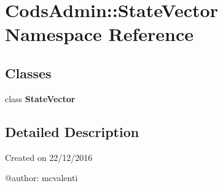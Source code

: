 \section{\-Cods\-Admin\-:\-:\-State\-Vector \-Namespace \-Reference}
\label{namespace_cods_admin_1_1_state_vector}
\subsection*{\-Classes}
\begin{DoxyCompactItemize}
\item 
class {\bf \-State\-Vector}
\end{DoxyCompactItemize}


\subsection{\-Detailed \-Description}
\begin{DoxyVerb}
Created on 22/12/2016

@author: mcvalenti
\end{DoxyVerb}
 
